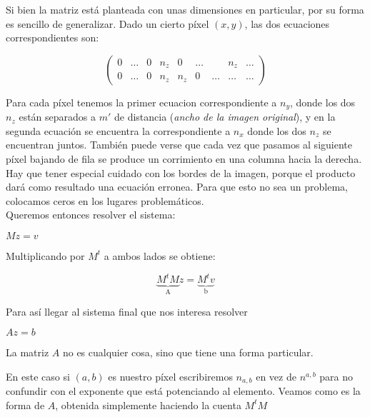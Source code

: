 Si bien la matriz está planteada con unas dimensiones en particular, por su forma es sencillo de generalizar. Dado un cierto píxel $(x, y)$, las dos ecuaciones correspondientes son:

\[
\begin{pmatrix}
    0 & \dots & 0 & n_{z} & 0     & \dots &       & n_{z} & \dots  \\
    0 & \dots & 0 & n_{z} & n_{z} & 0     & \dots & \dots & \dots
\end{pmatrix}
\]

Para cada píxel tenemos la primer ecuacion correspondiente a $n_y$, donde los dos $n_z$ están separados a $m'$ de distancia (\textit{ancho de la imagen original}), y en la segunda ecuación se encuentra la correspondiente a $n_x$ donde los dos $n_z$ se encuentran juntos. También puede verse que cada vez que pasamos al siguiente píxel bajando de fila se produce un corrimiento en una columna hacia la derecha. Hay que tener especial cuidado con los bordes de la imagen, porque el producto dará como resultado una ecuación erronea. Para que esto no sea un problema, colocamos ceros en los lugares problemáticos. \\

Queremos entonces resolver el sistema:

\begin{center}
$M z = v$
\end{center}

Multiplicando por $M^{t}$ a ambos lados se obtiene:
\begin{center}
\[\underbrace{M^{t} M}_{\text{A}} z = \underbrace{M^{t} v}_{\text{b}}\]
\end{center}

Para así llegar al sistema final que nos interesa resolver
\begin{center}
$A z = b$
\end{center}

La matriz $A$ no es cualquier cosa, sino que tiene una forma particular.

En este caso si $(a, b)$ es nuestro píxel escribiremos  $n_{a,b}$ en vez de $n^{a,b}$ para no confundir con el exponente que está potenciando al elemento. Veamos como es la forma de $A$, obtenida simplemente haciendo la cuenta $M^t M$


